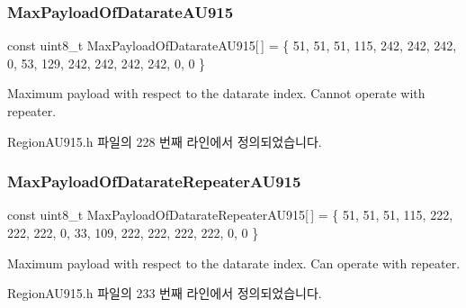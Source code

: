 \subsubsection{\texorpdfstring{Max\+Payload\+Of\+Datarate\+A\+U915}{MaxPayloadOfDatarateAU915}}
{\footnotesize\ttfamily const uint8\+\_\+t Max\+Payload\+Of\+Datarate\+A\+U915\mbox{[}$\,$\mbox{]} = \{ 51, 51, 51, 115, 242, 242, 242, 0, 53, 129, 242, 242, 242, 242, 0, 0 \}\hspace{0.3cm}{\ttfamily [static]}}

Maximum payload with respect to the datarate index. Cannot operate with repeater. 

Region\+A\+U915.\+h 파일의 228 번째 라인에서 정의되었습니다.

\mbox{\label{group___r_e_g_i_o_n_a_u915_ga4d811d08c5b947fdb028138f034317d0}} 
\subsubsection{\texorpdfstring{Max\+Payload\+Of\+Datarate\+Repeater\+A\+U915}{MaxPayloadOfDatarateRepeaterAU915}}
{\footnotesize\ttfamily const uint8\+\_\+t Max\+Payload\+Of\+Datarate\+Repeater\+A\+U915\mbox{[}$\,$\mbox{]} = \{ 51, 51, 51, 115, 222, 222, 222, 0, 33, 109, 222, 222, 222, 222, 0, 0 \}\hspace{0.3cm}{\ttfamily [static]}}

Maximum payload with respect to the datarate index. Can operate with repeater. 

Region\+A\+U915.\+h 파일의 233 번째 라인에서 정의되었습니다.

